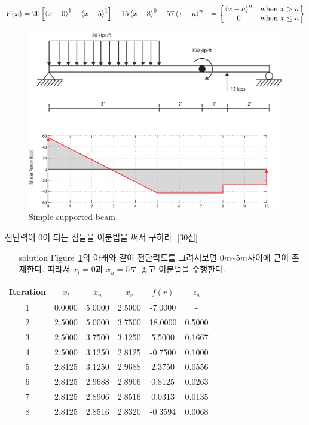 \documentclass[a4,10pt]{article}
\theoremstyle{examplestyle}
\let\\\tabularnewline
\let\\\tabularnewline
\begin{document}
\begin{align*}
V(x)&=20\left[\left<x-0\right>^{1}-\left<x-5\right>^{1}\right]-15\left<x-8\right>^{0}-57\\
\left<x-a\right>^{n}&=\begin{Bmatrix}\left<x-a\right>^{n}&\text{when  } x>a\\0&\text{when  } x\leq a\end{Bmatrix}
\end{align*}
\begin{figure}[!hbpt]
\centering
\includegraphics[keepaspectratio=true,width=0.7\linewidth]{finalterm/prob2a.eps}
\caption{Simple supported beam}
\label{fig:prob2a}
\end{figure}
전단력이 0이 되는 점들을 이분법을 써서 구하라. [30점]
\begin{itemize}
\item[solution] Figure~\ref{fig:prob2a}의 아래와 같이 전단력도를 그려서보면 $0m$\~$5m$사이에 근이 존재한다. 따라서 $x_{l}=0$과 $x_{u}=5$로 놓고 이분법을 수행한다.
\end{itemize}
\begin{table}[!hbpt]
\centering
\begin{tabular}{c|c|c|c|c|c}
\hline\hline
Iteration&$x_{l}$&$x_{u}$&$x_{r}$&$f(r)$&$\epsilon_{a}$\\
\hline
1&0.0000&5.0000&2.5000&-7.0000&-\\
2&2.5000&5.0000&3.7500&18.0000&0.5000\\
3&2.5000&3.7500&3.1250&5.5000&0.1667\\
4&2.5000&3.1250&2.8125&-0.7500&0.1000\\
5&2.8125&3.1250&2.9688&2.3750&0.0556\\
6&2.8125&2.9688&2.8906&0.8125&0.0263\\
7&2.8125&2.8906&2.8516&0.0313&0.0135\\
8&2.8125&2.8516&2.8320&-0.3594&0.0068\\
\hline\hline
\end{tabular}
\end{table}
\end{document}
